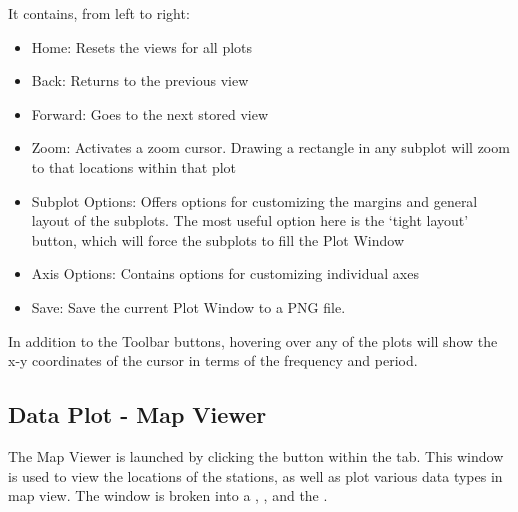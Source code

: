 \documentclass[letterpaper,10pt,english]{sphinxmanual}
\begin{document}
It contains, from left to right:
\begin{itemize}
\item {} 
Home: Resets the views for all plots

\item {} 
Back: Returns to the previous view

\item {} 
Forward: Goes to the next stored view

\item {} 
Zoom: Activates a zoom cursor. Drawing a rectangle in any subplot will zoom to that locations within that plot

\item {} 
Subplot Options: Offers options for customizing the margins and general layout of the subplots. The most useful option here is the ‘tight layout’ button, which will force the subplots to fill the Plot Window

\item {} 
Axis Options: Contains options for customizing individual axes

\item {} 
Save: Save the current Plot Window to a PNG file.

\end{itemize}

In addition to the Toolbar buttons, hovering over any of the plots will show the x-y coordinates of the cursor in terms of the frequency and period.


\subsection{Data Plot - Map Viewer}
\label{\detokenize{content/data_plot/map_viewer:data-plot-map-viewer}}\label{\detokenize{content/data_plot/map_viewer:map-viewer}}\label{\detokenize{content/data_plot/map_viewer::doc}}
\begin{figure}[htbp]
\centering

\noindent{}
\end{figure}

The Map Viewer is launched by clicking the {\hyperref[\detokenize{content/data_plot/main_window:show-map}]{}} button within the {\hyperref[\detokenize{content/data_plot/main_window:plot-options}]{}} tab.
This window is used to view the locations of the stations, as well as plot various data types in map view.
The window is broken into a {\hyperref[\detokenize{content/data_plot/map_viewer:menu-bar}]{}}, {\hyperref[\detokenize{content/data_plot/map_viewer:control-dock}]{}}, and the {\hyperref[\detokenize{content/data_plot/map_viewer:map-window}]{}}.
\end{document}
